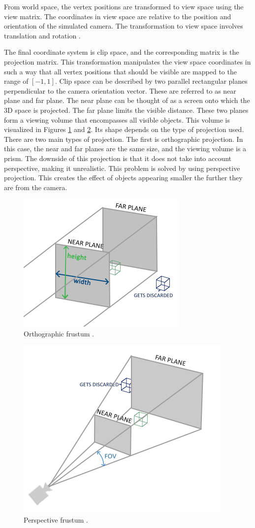 \documentclass[
  digital,     %
  oneside,     %
  nosansbold,  %
  nocolorbold, %
  lof,         %
  lot,         %
]{fithesis4}
\begin{document}
From world space, the vertex positions are transformed to view space using the view matrix.
The coordinates in view space are relative to the position and orientation of the
simulated camera. The transformation to view space involves translation and rotation \cite{learnopengl-coord-systems}.

The final coordinate system is clip space, and the corresponding matrix is the projection matrix.
This transformation manipulates the view space coordinates in such a way that all vertex positions
that should be visible are mapped to the range of $[-1, 1]$.
Clip space can be described by two parallel rectangular planes perpendicular to the camera orientation vector.
These are referred to as near plane and far plane. The near plane can be thought of as a screen onto which the 3D space is projected.
The far plane limits the visible distance. These two planes form a viewing volume that encompasses all visible objects.
This volume is visualized in Figures \ref{fig:orthographic-frustum} and \ref{fig:perspective-frustum}.
Its shape depends on the type of projection used.
There are two main types of projection. The first is orthographic projection. In this case, the near and far planes
are the same size, and the viewing volume is a prism. The downside of this projection is that it does not take into account
perspective, making it unrealistic. This problem is solved by using perspective projection.
This creates the effect of objects appearing smaller the further they are from the camera.
\begin{figure}[H]
    \centering
    \includegraphics[width=.5\textwidth]{images/orthographic_frustum.png}
    \caption{Orthographic frustum \cite{learnopengl-coord-systems}.}
    \label{fig:orthographic-frustum}
\end{figure}
\begin{figure}[H]
    \centering
    \includegraphics[width=.5\textwidth]{images/perspective_frustum.png}
    \caption{Perspective frustum \cite{learnopengl-coord-systems}.}
    \label{fig:perspective-frustum}
\end{figure}
\end{document}
